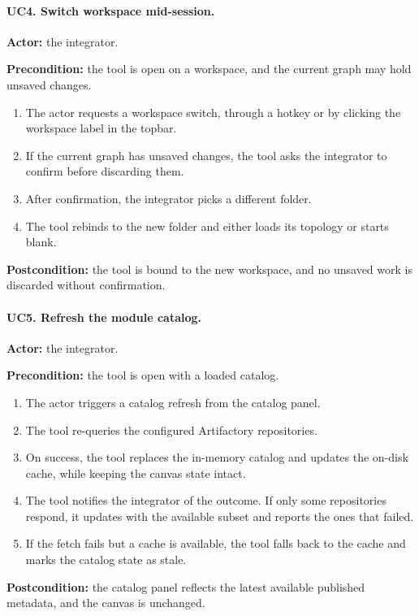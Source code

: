\paragraph{UC4. Switch workspace mid-session.}
\textbf{Actor:} the integrator. 

\noindent\textbf{Precondition:} the tool is open on a workspace, and the current graph may hold unsaved changes.
\begin{enumerate}
    \item The actor requests a workspace switch, through a hotkey or by clicking the workspace label in the topbar.
    \item If the current graph has unsaved changes, the tool asks the integrator to confirm before discarding them.
    \item After confirmation, the integrator picks a different folder.
    \item The tool rebinds to the new folder and either loads its topology or starts blank.
\end{enumerate}
\noindent\textbf{Postcondition:} the tool is bound to the new workspace, and no unsaved work is discarded without confirmation.

\paragraph{UC5. Refresh the module catalog.}
\textbf{Actor:} the integrator. 

\noindent\textbf{Precondition:} the tool is open with a loaded catalog.
\begin{enumerate}
    \item The actor triggers a catalog refresh from the catalog panel.
    \item The tool re-queries the configured Artifactory repositories.
    \item On success, the tool replaces the in-memory catalog and updates the on-disk cache, while keeping the canvas state intact.
    \item The tool notifies the integrator of the outcome. If only some repositories respond, it updates with the available subset and reports the ones that failed.
    \item If the fetch fails but a cache is available, the tool falls back to the cache and marks the catalog state as stale.
\end{enumerate}
\noindent\textbf{Postcondition:} the catalog panel reflects the latest available published metadata, and the canvas is unchanged.

